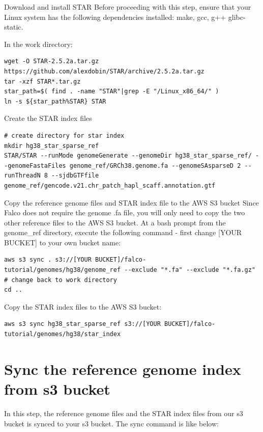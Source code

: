 \documentclass[
]{book}
\begin{document}
Download and install STAR
Before proceeding with this step, ensure that your Linux system has the following dependencies installed: make, gcc, g++ glibc-static.

In the work directory:

\begin{verbatim}
wget -O STAR-2.5.2a.tar.gz https://github.com/alexdobin/STAR/archive/2.5.2a.tar.gz
tar -xzf STAR*.tar.gz
star_path=$( find . -name "STAR"|grep -E "/Linux_x86_64/" )
ln -s ${star_path%STAR} STAR
\end{verbatim}

Create the STAR index files

\begin{verbatim}
# create directory for star index
mkdir hg38_star_sparse_ref
STAR/STAR --runMode genomeGenerate --genomeDir hg38_star_sparse_ref/ --genomeFastaFiles genome_ref/GRCh38.genome.fa --genomeSAsparseD 2 --runThreadN 8 --sjdbGTFfile genome_ref/gencode.v21.chr_patch_hapl_scaff.annotation.gtf
\end{verbatim}

Copy the reference genome files and STAR index file to the AWS S3 bucket
Since Falco does not require the genome .fa file, you will only need to copy the two other reference files to the AWS S3 bucket. At a bash prompt from the genome\_ref directory, execute the following command - first change {[}YOUR BUCKET{]} to your own bucket name:

\begin{verbatim}
aws s3 sync . s3://[YOUR BUCKET]/falco-tutorial/genomes/hg38/genome_ref --exclude "*.fa" --exclude "*.fa.gz"
# change back to work directory
cd ..
\end{verbatim}

Copy the STAR index files to the AWS S3 bucket:

\begin{verbatim}
aws s3 sync hg38_star_sparse_ref s3://[YOUR BUCKET]/falco-tutorial/genomes/hg38/star_index
\end{verbatim}

\hypertarget{sync-the-reference-genome-index-from-s3-bucket}{%
\section{Sync the reference genome index from s3 bucket}\label{sync-the-reference-genome-index-from-s3-bucket}}

In this step, the reference genome files and the STAR index files from our s3 bucket is synced to your s3 bucket.
The sync command is like below:
\end{document}
